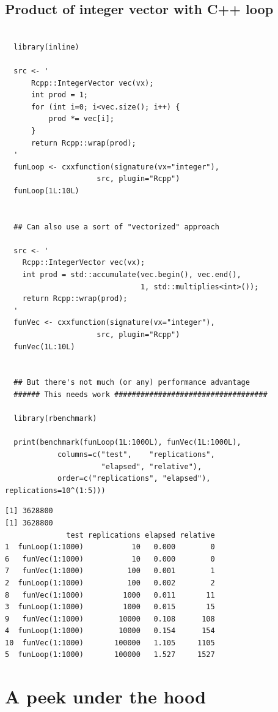 \documentclass[11pt]{article}
\begin{document}
\subsection{Product of integer vector with C++ loop}
\label{sec-3-3}



\begin{verbatim}
  
  library(inline)
  
  src <- '
      Rcpp::IntegerVector vec(vx);
      int prod = 1;
      for (int i=0; i<vec.size(); i++) {
          prod *= vec[i];
      }
      return Rcpp::wrap(prod);
  '
  funLoop <- cxxfunction(signature(vx="integer"),
                     src, plugin="Rcpp")
  funLoop(1L:10L)
  
    
  ## Can also use a sort of "vectorized" approach

  src <- '
    Rcpp::IntegerVector vec(vx);
    int prod = std::accumulate(vec.begin(), vec.end(),
                               1, std::multiplies<int>());
    return Rcpp::wrap(prod);
  '
  funVec <- cxxfunction(signature(vx="integer"),
                     src, plugin="Rcpp")
  funVec(1L:10L)
  

  ## But there's not much (or any) performance advantage
  ###### This needs work ###################################

  library(rbenchmark)
  
  print(benchmark(funLoop(1L:1000L), funVec(1L:1000L),
            columns=c("test",    "replications",
                      "elapsed", "relative"),
            order=c("replications", "elapsed"), replications=10^(1:5)))
\end{verbatim}


\begin{verbatim}
[1] 3628800
[1] 3628800
              test replications elapsed relative
1  funLoop(1:1000)           10   0.000        0
6   funVec(1:1000)           10   0.000        0
7   funVec(1:1000)          100   0.001        1
2  funLoop(1:1000)          100   0.002        2
8   funVec(1:1000)         1000   0.011       11
3  funLoop(1:1000)         1000   0.015       15
9   funVec(1:1000)        10000   0.108      108
4  funLoop(1:1000)        10000   0.154      154
10  funVec(1:1000)       100000   1.105     1105
5  funLoop(1:1000)       100000   1.527     1527
\end{verbatim}
\section{A peek under the hood}
\label{sec-4}
\end{document}
